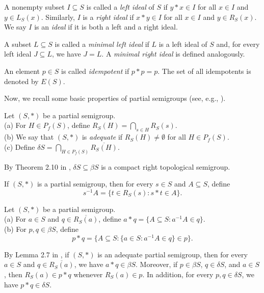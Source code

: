 \documentclass[twoside,11pt]{article}
\begin{document}
A nonempty subset \(I \subseteq S\) is called a \textit{left ideal} of \(S\) if \(y * x \in I\) for all \(x \in I\) and \(y \in L_S(x)\). Similarly, \(I\) is a \textit{right ideal} if \(x * y \in I\) for all \(x \in I\) and \(y \in R_S(x)\). We say \(I\) is an \textit{ideal} if it is both a left and a right ideal.

A subset \(L \subseteq S\) is called a \textit{minimal left ideal} if \(L\) is a left ideal of \(S\) and, for every left ideal \(J \subseteq L\), we have \(J = L\). A \textit{minimal right ideal} is defined analogously.

An element \(p \in S\) is called \textit{idempotent} if \(p * p = p\). The set of all idempotents is denoted by \(E(S)\).

Now, we recall some basic properties of partial semigroups (see, e.g., \cite{Bergelson5}).

\begin{definition}
	Let \((S, *)\) be a partial semigroup.\\
	(a) For \(H \in P_f(S)\), define \(R_S(H) = \bigcap_{s \in H} R_S(s)\).\\
	(b) We say that \((S, *)\) is \textit{adequate} if \(R_S(H) \neq \emptyset\) for all \(H \in P_f(S)\).\\
	(c) Define \(\delta S = \bigcap_{H \in P_f(S)} \overline{R_S(H)}\).
\end{definition}

By Theorem 2.10 in \cite{McCutcheon}, \(\delta S \subseteq \beta S\) is a compact right topological semigroup.

If \((S, *)\) is a partial semigroup, then for every \(s \in S\) and \(A \subseteq S\), define
\[
s^{-1} A = \{t \in R_S(s) : s * t \in A\}.
\]

\begin{definition}
	Let \((S, *)\) be a partial semigroup.\\
	(a) For \(a \in S\) and \(q \in \overline{R_S(a)}\), define \(a * q = \{A \subseteq S : a^{-1} A \in q\}\).\\
	(b) For \(p, q \in \beta S\), define
	\[
	p * q = \{A \subseteq S : \{a \in S : a^{-1} A \in q\} \in p\}.
	\]
\end{definition}

By Lemma 2.7 in \cite{McCutcheon}, if \((S, *)\) is an adequate partial semigroup, then for every \(a \in S\) and \(q \in \overline{R_S(a)}\), we have \(a * q \in \beta S\). Moreover, if \(p \in \beta S\), \(q \in \delta S\), and \(a \in S\), then \(R_S(a) \in p * q\) whenever \(R_S(a) \in p\). In addition, for every \(p, q \in \delta S\), we have \(p * q \in \delta S\).
\end{document}

